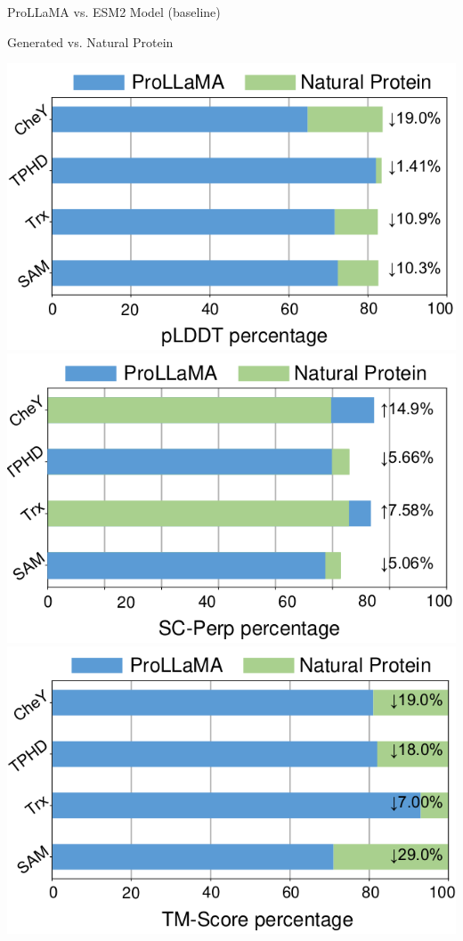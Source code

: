 \documentclass[dvipsnames]{beamer}
\begin{document}
\begin{frame}{ProLLaMA vs. ESM2 Model (baseline)}
\begin{center}
	\end{center}
\end{frame}

\begin{frame}{Generated vs. Natural Protein}
	\begin{center}
		\includegraphics[scale=0.7]{images/d.png}
		\includegraphics[scale=0.7]{images/e.png}
		\includegraphics[scale=0.7]{images/f.png}
	\end{center}
\end{frame}
\end{document}

